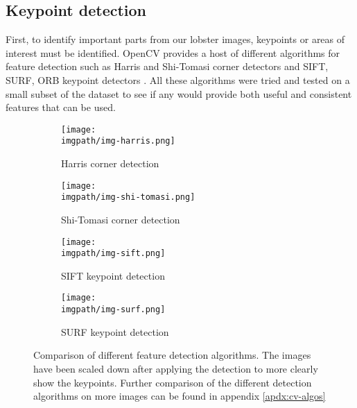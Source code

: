 \subsection{Keypoint detection}
First, to identify important parts from our lobster images, keypoints or areas of interest must be identified. OpenCV provides a host of different algorithms for feature detection such as Harris and Shi-Tomasi corner detectors and SIFT, SURF, ORB keypoint detectors \cite{opencv-tut1}. All these algorithms were tried and tested on a small subset of the dataset to see if any would provide both useful and consistent features that can be used. 

\begin{figure}[H]
	\begin{subfigure}{0.45\textwidth}
	\texttt{[image: \\imgpath/img-harris.png]}
	\caption{Harris corner detection}
	\end{subfigure}
	\hspace*{\fill}
	\begin{subfigure}{0.45\textwidth}
	\texttt{[image: \\imgpath/img-shi-tomasi.png]}
	\caption{Shi-Tomasi corner detection}
	\end{subfigure}
	
	\vspace{0.5cm}
	
	\begin{subfigure}{0.45\textwidth}
	\texttt{[image: \\imgpath/img-sift.png]}
	\caption{SIFT keypoint detection}
	\end{subfigure}
	\hspace*{\fill}
	\begin{subfigure}{0.45\textwidth}
	\texttt{[image: \\imgpath/img-surf.png]}
	\caption{SURF keypoint detection}
	\end{subfigure}
	
\caption{Comparison of different feature detection algorithms. The images have been scaled down after applying the detection to more clearly show the keypoints. Further comparison of the different detection algorithms on more images can be found in appendix \ref{apdx:cv-algos}}
\label{fig:kp-comparison}
\end{figure}
